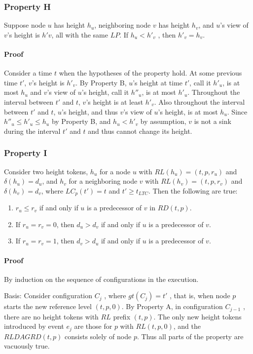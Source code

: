\documentclass{article}
\begin{document}
\subsubsection{Property H}
Suppose node $u$ has height $h_u$, neighboring node $v$ has height $h_v$, and $u$’s view of $v$’s height is $h'v$, all with the same $LP$. If $h_u < h'_v$ , then $h'_v = h_v$.\\

\paragraph{Proof}
Consider a time $t$ when the hypotheses of the property hold. At some previous time $t'$, $v$’s height is $h'_v$. By Property B, $u$’s height at time $t'$, call it $h'_u$, is at most $h_u$ and $v$’s view of $u$’s height, call it $h''_u$, is at most $h'_u$. Throughout the interval between $t'$ and $t$, $v$’s height is at least $h'_ v$. Also throughout the interval between $t'$ and $t$, $u$’s height, and thus $v$’s view of $u$’s height, is at most $h_u$. Since $h''_u \leq h'_u \leq h_u$ by Property B, and $h_u < h'_v$ by assumption, $v$ is not a sink during the interval $t'$ and $t$ and thus cannot change its height.


\subsubsection{Property I}
Consider two height tokens, $h_u$ for a node $u$ with $RL(h_u) = (t, p, r_u)$ and $\delta (h_u) = d_u$, and $h_v$ for a neighboring node $v$ with $RL(h_v) = (t, p, r_v)$ and $\delta (h_v) = d_v$, where $LC_p(t') = t$ and $t' \geq t_{LTC}$. Then the following are true:
\begin{enumerate}
\item $r_u \leq r_v$ if and only if $u$ is a predecessor of $v$ in $RD(t, p)$.
\item If $r_u = r_v = 0$, then $d_u > d_v$ if and only if $u$ is a predecessor of $v$.
\item If $r_u = r_v = 1$, then $d_v > d_u$ if and only if $u$ is a predecessor of $v$.
\end{enumerate}

\paragraph{Proof}
By induction on the sequence of configurations in the execution.

Basis: Consider configuration $C_j$ , where $gt(C_j) = t'$ , that is, when node $p$ starts the new reference level $(t, p, 0)$. By Property A, in configuration $C_{j − 1}$ , there are no height tokens with $RL$ prefix $(t, p)$. The only new height tokens introduced by event $e_j$ are those for $p$ with $RL(t, p, 0)$, and the $RL DAG RD(t, p)$ consists solely of node $p$. Thus all parts of the property are vacuously true.
\end{document}
